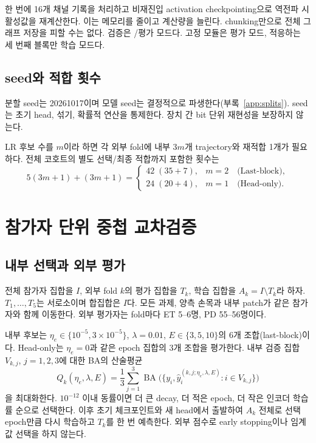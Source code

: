 \documentclass[11pt,a4paper]{article}
\newcommand{\code}[1]{\texttt{\detokenize{#1}}}
\DeclareMathOperator{\BA}{BA}
\begin{document}
한 번에 16개 채널 기록을 처리하고 비재진입 activation checkpointing으로 역전파 시 활성값을
재계산한다. 이는 메모리를 줄이고 계산량을 늘린다. chunking만으로 전체 그래프 저장을 피할 수는 없다.
검증은 \code{no_grad}/평가 모드다. 고정 모듈은 평가 모드, 적응하는 세 번째 블록만 학습 모드다.

\subsection{seed와 적합 횟수}
분할 seed는 20261017이며 모델 seed는 결정적으로 파생한다(부록~\ref{app:splits}).
seed는 초기 head, 섞기, 확률적 연산을 통제한다. 장치 간 bit 단위 재현성을 보장하지 않는다.

LR 후보 수를 $m$이라 하면 각 외부 fold에 내부 $3m$개 trajectory와 재적합 1개가 필요하다.
전체 코호트의 별도 선택/최종 적합까지 포함한 횟수는
\begin{equation}
 5(3m+1)+(3m+1)=\begin{cases}
 42\;(35+7),&m=2\quad\text{(Last-block)},\\
 24\;(20+4),&m=1\quad\text{(Head-only)}.
 \end{cases}
\end{equation}
\clearpage

\section{참가자 단위 중첩 교차검증}
\subsection{내부 선택과 외부 평가}
전체 참가자 집합을 $I$, 외부 fold $k$의 평가 집합을 $T_k$,
학습 집합을 $A_k=I\setminus T_k$라 하자. $T_1,\ldots,T_5$는 서로소이며
합집합은 $I$다. 모든 과제, 양측 손목과 내부 patch가 같은 참가자와 함께 이동한다.
외부 평가자는 fold마다 ET 5--6명, PD 55--56명이다.

내부 후보는 $\eta_e\in\{10^{-5},3\times10^{-5}\}$,
$\lambda=0.01$, $E\in\{3,5,10\}$의 6개 조합(last-block)이다.
Head-only는 $\eta_e=0$과 같은 epoch 집합의 3개 조합을 평가한다.
내부 검증 집합 $V_{k,j}$, $j=1,2,3$에 대한 BA의 산술평균
\begin{equation}
 Q_k(\eta_e,\lambda,E)=\frac13\sum_{j=1}^3
 \BA\bigl(\{y_i,\widehat y_i^{(k,j;\eta_e,\lambda,E)}:i\in V_{k,j}\}\bigr)
\end{equation}
을 최대화한다. $10^{-12}$ 이내 동률이면 더 큰 decay, 더 적은 epoch,
더 작은 인코더 학습률 순으로 선택한다.
이후 초기 체크포인트와 새 head에서 출발하여 $A_k$ 전체로 선택 epoch만큼 다시 학습하고
$T_k$를 한 번 예측한다. 외부 점수로 early stopping이나 임계값 선택을 하지 않는다.
\end{document}

